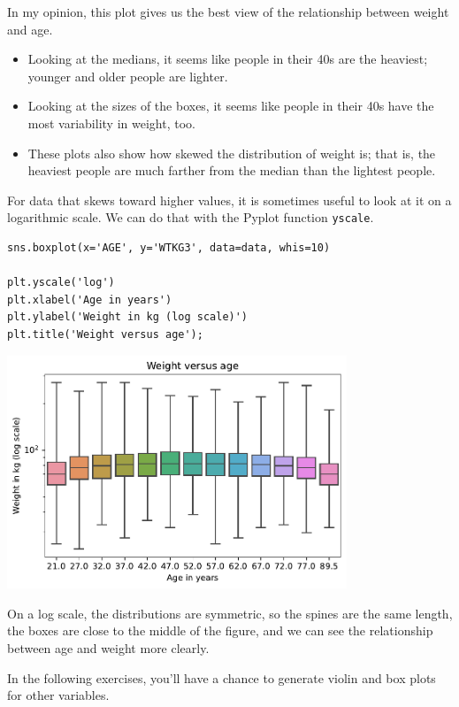 In my opinion, this plot gives us the best view of the relationship
between weight and age.

\begin{itemize}
\item
  Looking at the medians, it seems like people in their 40s are the
  heaviest; younger and older people are lighter.
\item
  Looking at the sizes of the boxes, it seems like people in their 40s
  have the most variability in weight, too.
\item
  These plots also show how skewed the distribution of weight is; that
  is, the heaviest people are much farther from the median than the
  lightest people.
\end{itemize}

For data that skews toward higher values, it is sometimes useful to look
at it on a logarithmic scale. We can do that with the Pyplot function
\passthrough{\lstinline!yscale!}.

\begin{lstlisting}[]
sns.boxplot(x='AGE', y='WTKG3', data=data, whis=10)

plt.yscale('log')
plt.xlabel('Age in years')
plt.ylabel('Weight in kg (log scale)')
plt.title('Weight versus age');
\end{lstlisting}

\begin{center}
\includegraphics[width=4in]{chapters/09_relationships_files/09_relationships_46_0.pdf}
\end{center}

On a log scale, the distributions are symmetric, so the spines are the
same length, the boxes are close to the middle of the figure, and we can
see the relationship between age and weight more clearly.

In the following exercises, you'll have a chance to generate violin and
box plots for other variables.

